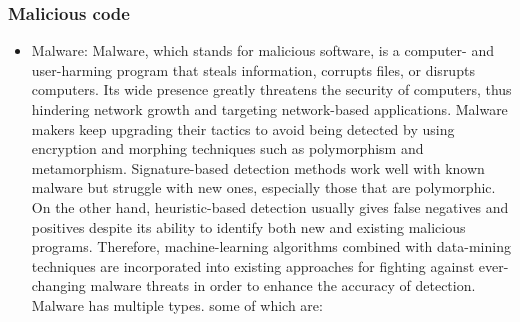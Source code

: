 \subsubsection{Malicious code}
\begin{itemize}
	\item Malware: Malware, which stands for malicious software, is a computer- and user-harming program that steals information, corrupts files, or disrupts computers. Its wide presence greatly threatens the security of computers, thus hindering network growth and targeting network-based applications. Malware makers keep upgrading their tactics to avoid being detected by using encryption and morphing techniques such as polymorphism and metamorphism. Signature-based detection methods work well with known malware but struggle with new ones, especially those that are polymorphic. On the other hand, heuristic-based detection usually gives false negatives and positives despite its ability to identify both new and existing malicious programs. Therefore, machine-learning algorithms combined with data-mining techniques are incorporated into existing approaches for fighting against ever-changing malware threats in order to enhance the accuracy of detection. \cite{malware} Malware has multiple types. some of which are:


\end{itemize}
